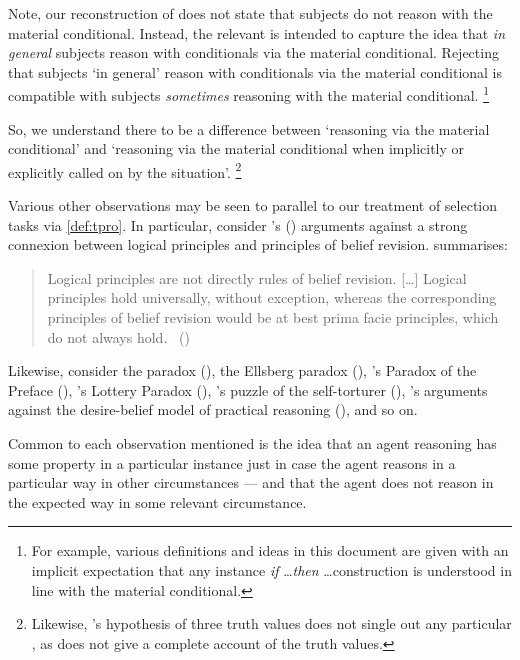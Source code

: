 \begin{note}
  Note, our reconstruction of \citeauthor{Wason:1966aa} does not state that subjects do not reason with the material conditional.
  Instead, the relevant \torN{} is intended to capture the idea that \emph{in general} subjects reason with conditionals via the material conditional.
  Rejecting that subjects `in general' reason with conditionals via the material conditional is compatible with subjects \emph{sometimes} reasoning with the material conditional.%
  \footnote{
    For example, various definitions and ideas in this document are given with an implicit expectation that any instance \emph{if} \dots \emph{then} \dots construction is understood in line with the material conditional.
  }

  So, we understand there to be a difference between `reasoning via the material conditional' and `reasoning via the material conditional when implicitly or explicitly called on by the situation'.%
  \footnote{
    Likewise, \citeauthor{Wason:1966aa}'s hypothesis of three truth values does not single out any particular \torN{}, as \citeauthor{Wason:1966aa} does not give a complete account of the truth values.
  }
\end{note}


\begin{note}
  Various other observations may be seen to parallel to our treatment of selection tasks via \autoref{def:tpro}.
  In particular, consider \citeauthor{Harman:1984aa}'s (\citeyear{Harman:1984aa,Harman:1986ux}) arguments against a strong connexion between logical principles and principles of belief revision.
  \citeauthor{Harman:1984aa} summarises:
  \begin{quote}
    Logical principles are not directly rules of belief revision.
    [\dots]
    Logical principles hold universally, without exception, whereas the corresponding principles of belief revision would be at best prima facie principles, which do not always hold.%
    \mbox{ }\hfill\mbox{(\citeyear[107--108]{Harman:1984aa})}
  \end{quote}
  Likewise, consider the \citeauthor{Allais:1979aa} paradox (\cite{Allais:1979aa}),
  the Ellsberg paradox (\cite{Ellsberg:1961aa}), \citeauthor{Makinson:1965aa}'s Paradox of the Preface (\citeyear{Makinson:1965aa}), \citeauthor{Kyburg:1997aa}'s Lottery Paradox (\citeyear{Kyburg:1997aa}), \citeauthor{Quinn:1990aa}'s  puzzle of the self-torturer (\citeyear{Quinn:1990aa}), \citeauthor{Bratman:1981aa}'s arguments against the desire-belief model of practical reasoning (\citeyear{Bratman:1981aa,Bratman:1987aa}), and so on.

  Common to each observation mentioned is the idea that an agent \agents{} reasoning has some property in a particular instance just in case the agent reasons in a particular way in other circumstances --- and that the agent does not reason in the expected way in some relevant circumstance.
\end{note}



